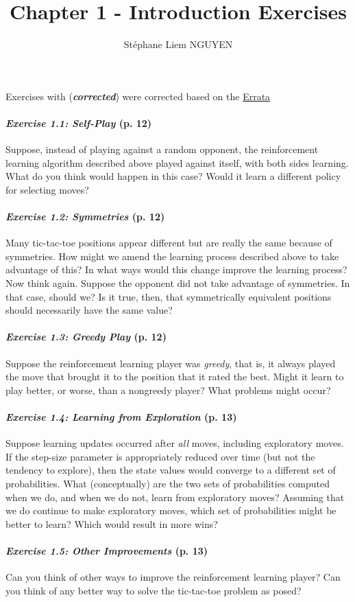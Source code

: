 \documentclass[10pt,a4paper]{article}
\title{Chapter 1 - Introduction Exercises}
\author{Stéphane Liem NGUYEN}
\begin{document}
\maketitle

Exercises with (\textbf{\textit{corrected}}) were corrected based on the \href{http://incompleteideas.net/book/errata.html}{Errata}

\paragraph{\textit{Exercise 1.1: Self-Play} (p. 12)}  Suppose, instead of playing against a random opponent, the reinforcement learning algorithm described above played against itself, with both sides learning. What do you think would happen in this case? Would it learn a different policy for selecting moves?

\paragraph{\textit{Exercise 1.2: Symmetries} (p. 12)} Many tic-tac-toe positions appear different but are really the same because of symmetries. How might we amend the learning process described above to take advantage of this? In what ways would this change improve the learning process? Now think again. Suppose the opponent did not take advantage of symmetries. In that case, should we? Is it true, then, that symmetrically equivalent positions should necessarily have the same value?

\paragraph{\textit{Exercise 1.3: Greedy Play} (p. 12)} Suppose the reinforcement learning player was \textit{greedy}, that is, it always played the move that brought it to the position that it rated the best. Might it learn to play better, or worse, than a nongreedy player? What problems might occur?

\paragraph{\textit{Exercise 1.4: Learning from Exploration} (p. 13)} Suppose learning updates occurred after \textit{all} moves, including exploratory moves. If the step-size parameter is appropriately reduced over time (but not the tendency to explore), then the state values would converge to a different set of probabilities. What (conceptually) are the two sets of probabilities computed when we do, and when we do not, learn from exploratory moves? Assuming that we do continue to make exploratory moves, which set of probabilities might be better to learn? Which would result in more wins?

\paragraph{\textit{Exercise 1.5: Other Improvements} (p. 13)} Can you think of other ways to improve the reinforcement learning player? Can you think of any better way to solve the tic-tac-toe problem as posed?
\end{document}
